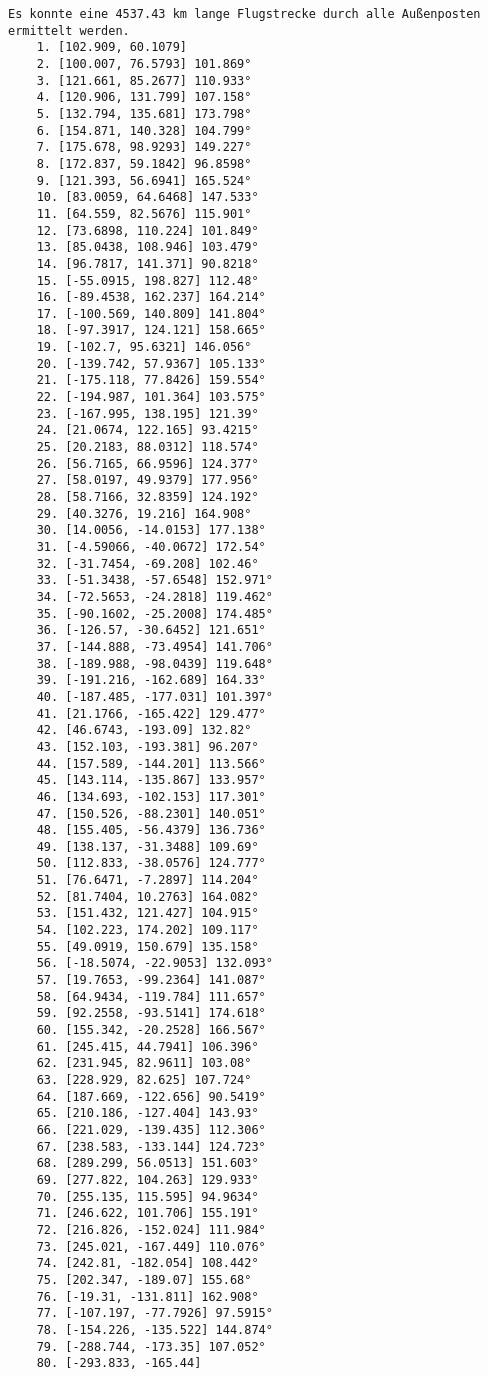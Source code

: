 \documentclass[a4paper,10pt,ngerman]{scrartcl}
\begin{document}
    \begin{lstlisting}[frame=single, title=Programmausgabe wenigerkrumm6.txt, breaklines=true,label={lst:lstlisting4}]
    Es konnte eine 4537.43 km lange Flugstrecke durch alle Außenposten ermittelt werden.
    1. [102.909, 60.1079]
    2. [100.007, 76.5793] 101.869°
    3. [121.661, 85.2677] 110.933°
    4. [120.906, 131.799] 107.158°
    5. [132.794, 135.681] 173.798°
    6. [154.871, 140.328] 104.799°
    7. [175.678, 98.9293] 149.227°
    8. [172.837, 59.1842] 96.8598°
    9. [121.393, 56.6941] 165.524°
    10. [83.0059, 64.6468] 147.533°
    11. [64.559, 82.5676] 115.901°
    12. [73.6898, 110.224] 101.849°
    13. [85.0438, 108.946] 103.479°
    14. [96.7817, 141.371] 90.8218°
    15. [-55.0915, 198.827] 112.48°
    16. [-89.4538, 162.237] 164.214°
    17. [-100.569, 140.809] 141.804°
    18. [-97.3917, 124.121] 158.665°
    19. [-102.7, 95.6321] 146.056°
    20. [-139.742, 57.9367] 105.133°
    21. [-175.118, 77.8426] 159.554°
    22. [-194.987, 101.364] 103.575°
    23. [-167.995, 138.195] 121.39°
    24. [21.0674, 122.165] 93.4215°
    25. [20.2183, 88.0312] 118.574°
    26. [56.7165, 66.9596] 124.377°
    27. [58.0197, 49.9379] 177.956°
    28. [58.7166, 32.8359] 124.192°
    29. [40.3276, 19.216] 164.908°
    30. [14.0056, -14.0153] 177.138°
    31. [-4.59066, -40.0672] 172.54°
    32. [-31.7454, -69.208] 102.46°
    33. [-51.3438, -57.6548] 152.971°
    34. [-72.5653, -24.2818] 119.462°
    35. [-90.1602, -25.2008] 174.485°
    36. [-126.57, -30.6452] 121.651°
    37. [-144.888, -73.4954] 141.706°
    38. [-189.988, -98.0439] 119.648°
    39. [-191.216, -162.689] 164.33°
    40. [-187.485, -177.031] 101.397°
    41. [21.1766, -165.422] 129.477°
    42. [46.6743, -193.09] 132.82°
    43. [152.103, -193.381] 96.207°
    44. [157.589, -144.201] 113.566°
    45. [143.114, -135.867] 133.957°
    46. [134.693, -102.153] 117.301°
    47. [150.526, -88.2301] 140.051°
    48. [155.405, -56.4379] 136.736°
    49. [138.137, -31.3488] 109.69°
    50. [112.833, -38.0576] 124.777°
    51. [76.6471, -7.2897] 114.204°
    52. [81.7404, 10.2763] 164.082°
    53. [151.432, 121.427] 104.915°
    54. [102.223, 174.202] 109.117°
    55. [49.0919, 150.679] 135.158°
    56. [-18.5074, -22.9053] 132.093°
    57. [19.7653, -99.2364] 141.087°
    58. [64.9434, -119.784] 111.657°
    59. [92.2558, -93.5141] 174.618°
    60. [155.342, -20.2528] 166.567°
    61. [245.415, 44.7941] 106.396°
    62. [231.945, 82.9611] 103.08°
    63. [228.929, 82.625] 107.724°
    64. [187.669, -122.656] 90.5419°
    65. [210.186, -127.404] 143.93°
    66. [221.029, -139.435] 112.306°
    67. [238.583, -133.144] 124.723°
    68. [289.299, 56.0513] 151.603°
    69. [277.822, 104.263] 129.933°
    70. [255.135, 115.595] 94.9634°
    71. [246.622, 101.706] 155.191°
    72. [216.826, -152.024] 111.984°
    73. [245.021, -167.449] 110.076°
    74. [242.81, -182.054] 108.442°
    75. [202.347, -189.07] 155.68°
    76. [-19.31, -131.811] 162.908°
    77. [-107.197, -77.7926] 97.5915°
    78. [-154.226, -135.522] 144.874°
    79. [-288.744, -173.35] 107.052°
    80. [-293.833, -165.44]
    \end{lstlisting}
\end{document}
